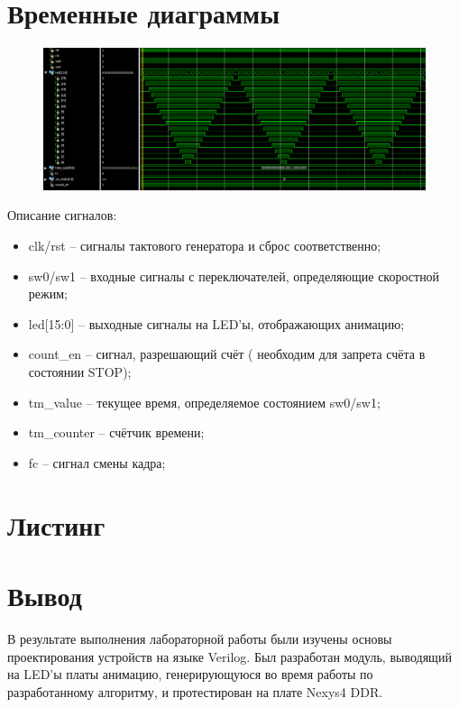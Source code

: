 \documentclass[a4paper, 10pt]{article}
\begin{document}
     \section*{Временные диаграммы}
        \begin{figure}[h!]
            \includegraphics[scale=0.5]{../images/animation.png}
        \end{figure}
        Описание сигналов:
        \begin{itemize}
            \item clk/rst -- сигналы тактового генератора и сброс соответственно;
            \item sw0/sw1 -- входные сигналы с переключателей, определяющие скоростной режим;
            \item led[15:0] -- выходные сигналы на LED'ы, отображающих анимацию;
            \item count\_en -- сигнал, разрешающий счёт ( необходим для запрета счёта в состоянии STOP);
            \item tm\_value -- текущее время, определяемое состоянием sw0/sw1;
            \item tm\_counter -- счётчик времени;
            \item fc -- сигнал смены кадра;
        \end{itemize}

     \section*{Листинг}
        
        
        
        
        

    \section*{Вывод}
            В результате выполнения лабораторной работы были изучены основы проектирования устройств на языке Verilog. Был разработан модуль, выводящий на LED'ы платы анимацию, генерирующуюся во время работы по разработанному алгоритму, и протестирован на плате Nexys4 DDR.
\end{document}
